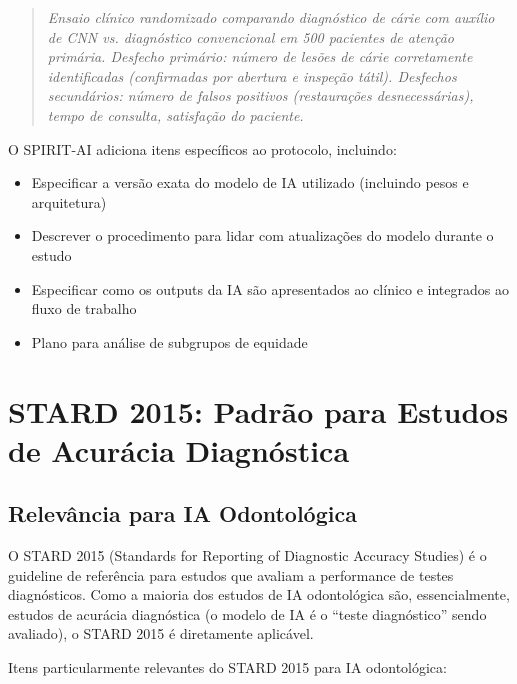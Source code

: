 \begin{quote}
\textit{Ensaio clínico randomizado comparando diagnóstico de cárie com auxílio de CNN vs. diagnóstico convencional em 500 pacientes de atenção primária. Desfecho primário: número de lesões de cárie corretamente identificadas (confirmadas por abertura e inspeção tátil). Desfechos secundários: número de falsos positivos (restaurações desnecessárias), tempo de consulta, satisfação do paciente.}
\end{quote}

O SPIRIT-AI adiciona itens específicos ao protocolo, incluindo:
\begin{itemize}
    \item Especificar a versão exata do modelo de IA utilizado (incluindo pesos e arquitetura)
    \item Descrever o procedimento para lidar com atualizações do modelo durante o estudo
    \item Especificar como os outputs da IA são apresentados ao clínico e integrados ao fluxo de trabalho
    \item Plano para análise de subgrupos de equidade
\end{itemize}

\section{STARD 2015: Padrão para Estudos de Acurácia Diagnóstica}

\subsection{Relevância para IA Odontológica}

O STARD 2015 (Standards for Reporting of Diagnostic Accuracy Studies)  é o guideline de referência para estudos que avaliam a performance de testes diagnósticos. Como a maioria dos estudos de IA odontológica são, essencialmente, estudos de acurácia diagnóstica (o modelo de IA é o ``teste diagnóstico'' sendo avaliado), o STARD 2015 é diretamente aplicável.

Itens particularmente relevantes do STARD 2015 para IA odontológica:

